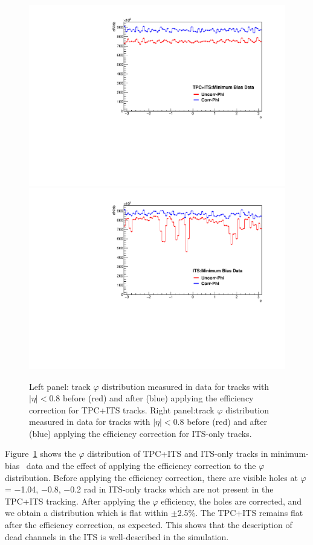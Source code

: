 \begin{figure}[h]
\center
\includegraphics[width=.495\textwidth]{Data_Analysis/Tracking/phi_efficiency_cor_tpc.pdf}
\includegraphics[width=.495\textwidth]{Data_Analysis/Tracking/phi_efficiency_cor_its.pdf}
\caption{Left panel: track $\varphi$ distribution measured in data for tracks with $|\eta|<0.8$ before (red) and after (blue) applying the efficiency correction for TPC+ITS tracks. Right panel:track $\varphi$ distribution measured in data for tracks with $|\eta|<0.8$ before (red) and after (blue) applying the efficiency correction for ITS-only tracks.}
\label{fig:phiCorr}
\end{figure}

Figure~\ref{fig:phiCorr} shows the $\varphi$ distribution of TPC+ITS and ITS-only tracks in minimum-bias \pPb~data and the effect of applying the efficiency correction to the $\varphi$ distribution. Before applying the efficiency correction, there are visible holes at $\varphi$ = $-$1.04, $-$0.8, $-$0.2 rad in ITS-only tracks which are not present in the TPC+ITS tracking. After applying the $\varphi$ efficiency, the holes are corrected, and we obtain a distribution which is flat within {$\pm$2.5\%}. The TPC+ITS remains flat after the efficiency correction, as expected. This shows that the description of dead channels in the ITS is well-described in the simulation. 

\FloatBarrier
